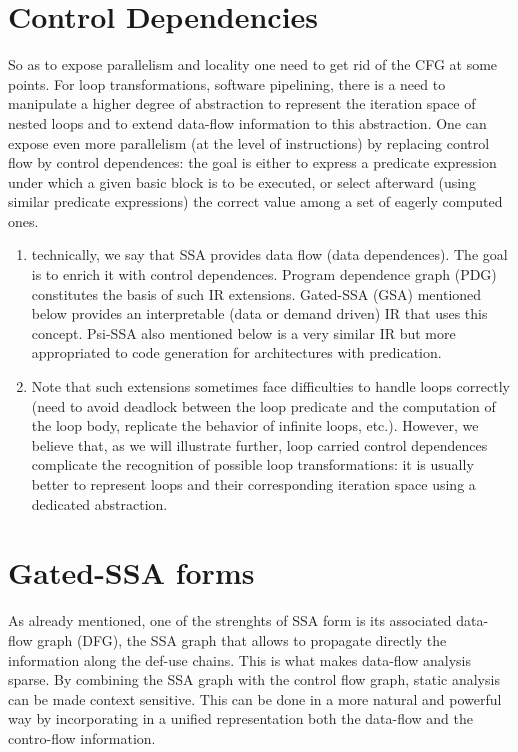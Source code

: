 \section{Control Dependencies}
So as to expose parallelism and locality one need to get rid of the CFG at some points. 
For loop transformations, software pipelining, there is a need to manipulate a higher degree of abstraction to represent the iteration space of nested loops and to extend data-flow information to this abstraction. 
One can expose even more parallelism (at the level of instructions) by replacing control flow by control dependences: 
the goal is either to express a predicate expression under which a given basic block is to be executed, or select afterward (using similar predicate expressions) the correct value among a set of eagerly computed ones.
\begin{enumerate}
\item technically, we say that SSA provides data flow (data dependences). 
  The goal is to enrich it with control dependences. 
  Program dependence graph (PDG) constitutes the basis of such IR extensions. 
  Gated-SSA (GSA) mentioned below provides an interpretable (data or demand driven) IR that uses this concept. 
  Psi-SSA also mentioned below is a very similar IR but more appropriated to code generation for architectures with predication. 
\item Note that such extensions sometimes face difficulties to handle loops correctly (need to avoid deadlock between the loop predicate and the computation of the loop body, replicate the behavior of infinite loops, etc.). 
  However, we believe that, as we will illustrate further, loop carried control dependences complicate the recognition of possible loop transformations: 
  it is usually better to represent loops and their corresponding iteration space using a dedicated abstraction.
\end{enumerate}

\section{Gated-SSA forms}
As already mentioned, one of the strenghts of SSA form is its associated data-flow graph (DFG), the SSA graph that allows to propagate directly the information along the def-use chains.
This is what makes data-flow analysis sparse.
By combining the SSA graph with the control flow graph, static analysis can be made context sensitive.
This can be done in a more natural and powerful way by incorporating in a unified representation both the data-flow and the contro-flow information.

